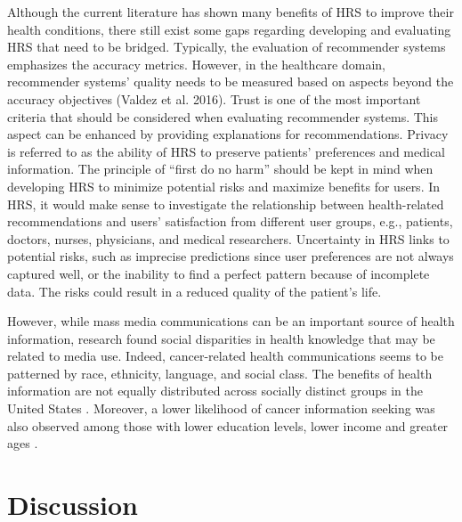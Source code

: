 Although the current literature has shown many benefits of HRS to improve their health conditions, there still exist some gaps regarding developing and evaluating HRS that need to be bridged. Typically, the evaluation of recommender systems emphasizes the accuracy metrics. However, in the healthcare domain, recommender systems' quality needs to be measured based on aspects beyond the accuracy objectives (Valdez et al. 2016). Trust is one of the most important criteria that should be considered when evaluating recommender systems. This aspect can be enhanced by providing explanations for recommendations. Privacy is referred to as the ability of HRS to preserve patients' preferences and medical information. The principle of ``first do no harm'' should be kept in mind when developing HRS to minimize potential risks and maximize benefits for users. In HRS, it would make sense to investigate the relationship between health-related recommendations and users' satisfaction from different user groups, e.g., patients, doctors, nurses, physicians, and medical researchers. Uncertainty in HRS links to potential risks, such as imprecise predictions since user preferences are not always captured well, or the inability to find a perfect pattern because of incomplete data. The risks could result in a reduced quality of the patient's life.

However, while mass media communications can be an important source of health information, research found social disparities in health knowledge that may be related to media use. Indeed, cancer-related health communications seems to be patterned by race, ethnicity, language, and social class. The benefits of health information are not equally distributed across socially distinct groups in the United States \cite{viswanath_race_2011}. Moreover, a lower likelihood of cancer information seeking was also observed among those with lower education levels, lower income and greater ages \cite{finney_rutten_cancer-related_2016}.

\section{Discussion}
